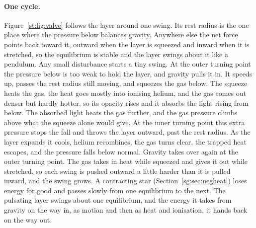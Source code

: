 \paragraph{One cycle.} Figure~\ref{st:fig:valve} follows the layer around one swing. Its rest radius is the one place where the pressure below balances gravity. Anywhere else the net force points back toward it, outward when the layer is squeezed and inward when it is stretched, so the equilibrium is stable and the layer swings about it like a pendulum. Any small disturbance starts a tiny swing. At the outer turning point the pressure below is too weak to hold the layer, and gravity pulls it in. It speeds up, passes the rest radius still moving, and squeezes the gas below. The squeeze heats the gas, the heat goes mostly into ionising helium, and the gas comes out denser but hardly hotter, so its opacity rises and it absorbs the light rising from below. The absorbed light heats the gas further, and the gas pressure climbs above what the squeeze alone would give. At the inner turning point this extra pressure stops the fall and throws the layer outward, past the rest radius. As the layer expands it cools, helium recombines, the gas turns clear, the trapped heat escapes, and the pressure falls below normal. Gravity takes over again at the outer turning point. The gas takes in heat while squeezed and gives it out while stretched, so each swing is pushed outward a little harder than it is pulled inward, and the swing grows. A contracting star (Section~\ref{sg:sec:negheat}) loses energy for good and passes slowly from one equilibrium to the next. The pulsating layer swings about one equilibrium, and the energy it takes from gravity on the way in, as motion and then as heat and ionisation, it hands back on the way out.

